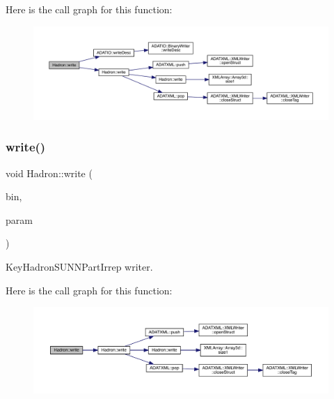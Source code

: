 Here is the call graph for this function\+:\nopagebreak
\begin{figure}[H]
\begin{center}
\leavevmode
\includegraphics[width=350pt]{d1/daf/namespaceHadron_aa05ac649ec39cb98483ab55274129758_cgraph}
\end{center}
\end{figure}
\mbox{\label{namespaceHadron_a1ab9211268895b4f05c4d46ff18dff6d}} 
\subsubsection{\texorpdfstring{write()}{write()}\hspace{0.1cm}{\footnotesize\ttfamily [83/95]}}
{\footnotesize\ttfamily void Hadron\+::write (\begin{DoxyParamCaption}\item[{\mbox{\hyperlink{classADATIO_1_1BinaryWriter}{Binary\+Writer}} \&}]{bin,  }\item[{const \mbox{\hyperlink{structHadron_1_1KeyHadronSUNNPartIrrepOp__t}{Key\+Hadron\+S\+U\+N\+N\+Part\+Irrep\+Op\+\_\+t}} \&}]{param }\end{DoxyParamCaption})}



Key\+Hadron\+S\+U\+N\+N\+Part\+Irrep writer. 

Here is the call graph for this function\+:\nopagebreak
\begin{figure}[H]
\begin{center}
\leavevmode
\includegraphics[width=350pt]{d1/daf/namespaceHadron_a1ab9211268895b4f05c4d46ff18dff6d_cgraph}
\end{center}
\end{figure}
\mbox{\label{namespaceHadron_aa056cb1973613af20ddde740db299944}} 
